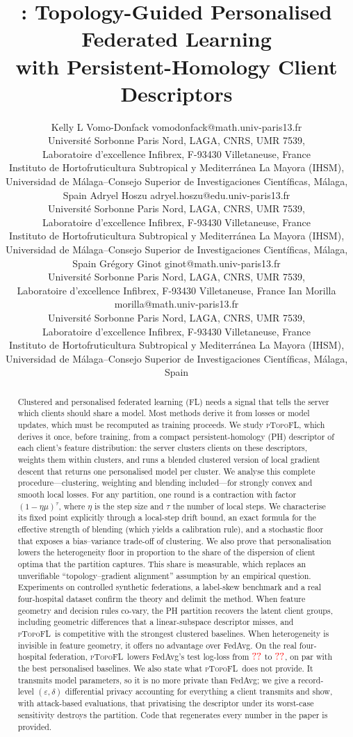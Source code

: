 \documentclass[10pt]{article} %
\title{\ptopofl: Topology-Guided Personalised Federated Learning\\
       with Persistent-Homology Client Descriptors}
\author{\name Kelly L Vomo-Donfack \email vomodonfack@math.univ-paris13.fr \\
      \addr Universit\'e Sorbonne Paris Nord, LAGA, CNRS, UMR 7539,\\
      Laboratoire d'excellence Infibrex, F-93430 Villetaneuse, France\\
      Instituto de Hortofruticultura Subtropical y Mediterr\'anea La Mayora
      (IHSM), Universidad de M\'alaga--Consejo Superior de Investigaciones
      Cient\'ificas, M\'alaga, Spain
      \AND
      \name Adryel Hoszu \email adryel.hoszu@edu.univ-paris13.fr \\
      \addr Universit\'e Sorbonne Paris Nord, LAGA, CNRS, UMR 7539,\\
      Laboratoire d'excellence Infibrex, F-93430 Villetaneuse, France\\
      Instituto de Hortofruticultura Subtropical y Mediterr\'anea La Mayora
      (IHSM), Universidad de M\'alaga--Consejo Superior de Investigaciones
      Cient\'ificas, M\'alaga, Spain
      \AND
      \name Gr\'egory Ginot \email ginot@math.univ-paris13.fr \\
      \addr Universit\'e Sorbonne Paris Nord, LAGA, CNRS, UMR 7539,\\
      Laboratoire d'excellence Infibrex, F-93430 Villetaneuse, France
      \AND
      \name Ian Morilla \email morilla@math.univ-paris13.fr \\
      \addr Universit\'e Sorbonne Paris Nord, LAGA, CNRS, UMR 7539,\\
      Laboratoire d'excellence Infibrex, F-93430 Villetaneuse, France\\
      Instituto de Hortofruticultura Subtropical y Mediterr\'anea La Mayora
      (IHSM), Universidad de M\'alaga--Consejo Superior de Investigaciones
      Cient\'ificas, M\'alaga, Spain}
\newcommand{\ptopofl}{\textsc{pTopoFL}}
\theoremstyle{definition}
\theoremstyle{remark}
\begin{document}
\maketitle

\begin{abstract}
Clustered and personalised federated learning (FL) needs a signal that tells the server
which clients should share a model. Most methods derive it from losses or model updates,
which must be recomputed as training proceeds. We study \ptopofl, which derives it once,
before training, from a compact persistent-homology (PH) descriptor of each client's
feature distribution: the server clusters clients on these descriptors, weights them within
clusters, and runs a blended clustered version of local gradient descent that returns one
personalised model per cluster. We analyse this complete procedure---clustering, weighting
and blending included---for strongly convex and smooth local losses. For any partition, one
round is a contraction with factor $(1-\eta\mu)^{\tau}$, where $\eta$ is the step size and
$\tau$ the number of local steps. We characterise its fixed point explicitly through a
local-step drift bound, an exact formula for the effective strength of blending (which
yields a calibration rule), and a stochastic floor that exposes a bias--variance trade-off
of clustering. We also prove that personalisation lowers the heterogeneity floor in
proportion to the share of the dispersion of client optima that the partition captures.
This share is measurable, which replaces an unverifiable ``topology--gradient alignment''
assumption by an empirical question. Experiments on controlled synthetic federations, a
label-skew benchmark and a real four-hospital dataset confirm the theory and delimit the
method. When feature geometry and decision rules co-vary, the PH partition recovers the
latent client groups, including geometric differences that a linear-subspace descriptor
misses, and \ptopofl\ is competitive with the strongest clustered baselines. When
heterogeneity is invisible in feature geometry, it offers no advantage over FedAvg. On the real four-hospital federation, \ptopofl\ lowers
FedAvg's test log-loss from $\textcolor{red}{??}$ to $\textcolor{red}{??}$, on par with the best
personalised baselines. We
also state what \ptopofl\ does not provide. It transmits model parameters, so it is no
more private than FedAvg; we give a record-level $(\varepsilon,\delta)$ differential
privacy accounting for everything a client transmits and show, with attack-based
evaluations, that privatising the descriptor under its worst-case sensitivity destroys the
partition. Code that regenerates every number in the paper is provided.
\end{abstract}





\end{document}
